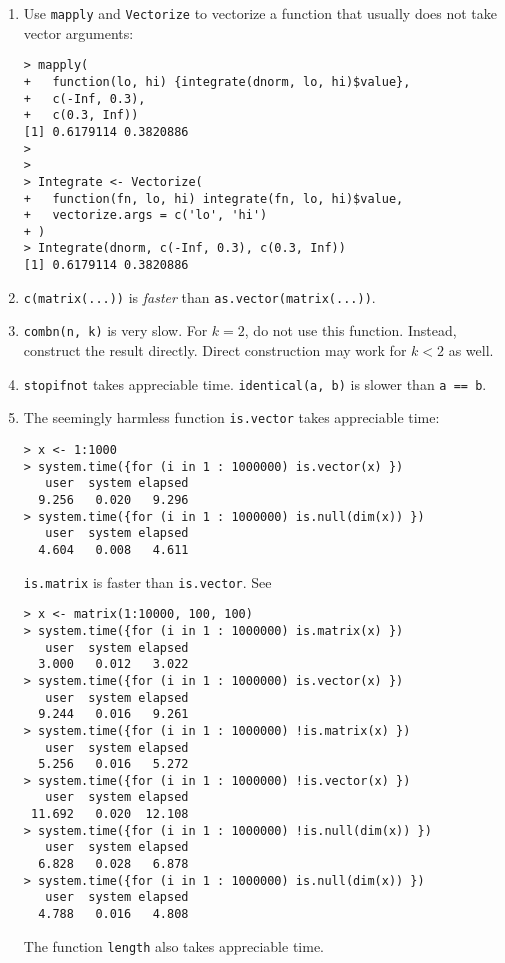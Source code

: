 \documentclass[12pt]{article}
\newcommand\Rf[1]{\texttt{#1}}
\begin{document}
\begin{enumerate}
\item
Use \Rf{mapply} and \Rf{Vectorize} to vectorize a function that usually
does not take vector arguments:
\begin{verbatim}
> mapply(
+   function(lo, hi) {integrate(dnorm, lo, hi)$value},
+   c(-Inf, 0.3),
+   c(0.3, Inf))
[1] 0.6179114 0.3820886
>
>
> Integrate <- Vectorize(
+   function(fn, lo, hi) integrate(fn, lo, hi)$value,
+   vectorize.args = c('lo', 'hi')
+ )
> Integrate(dnorm, c(-Inf, 0.3), c(0.3, Inf))
[1] 0.6179114 0.3820886
\end{verbatim}


\item
\Rf{c(matrix(...))} is \emph{faster} than
\Rf{as.vector(matrix(...))}.

\item
\Rf{combn(n, k)} is very slow.
For $k = 2$, do not use this function.
Instead, construct the result directly.
Direct construction may work for $k < 2$ as well.

\item
\Rf{stopifnot} takes appreciable time.
\Rf{identical(a, b)} is slower than \Rf{a == b}.


\item
The seemingly harmless function \Rf{is.vector} takes appreciable time:
\begin{verbatim}
> x <- 1:1000
> system.time({for (i in 1 : 1000000) is.vector(x) })
   user  system elapsed
  9.256   0.020   9.296
> system.time({for (i in 1 : 1000000) is.null(dim(x)) })
   user  system elapsed
  4.604   0.008   4.611
\end{verbatim}
\Rf{is.matrix} is faster than \Rf{is.vector}. See
\begin{verbatim}
> x <- matrix(1:10000, 100, 100)
> system.time({for (i in 1 : 1000000) is.matrix(x) })
   user  system elapsed
  3.000   0.012   3.022
> system.time({for (i in 1 : 1000000) is.vector(x) })
   user  system elapsed
  9.244   0.016   9.261
> system.time({for (i in 1 : 1000000) !is.matrix(x) })
   user  system elapsed
  5.256   0.016   5.272
> system.time({for (i in 1 : 1000000) !is.vector(x) })
   user  system elapsed
 11.692   0.020  12.108
> system.time({for (i in 1 : 1000000) !is.null(dim(x)) })
   user  system elapsed
  6.828   0.028   6.878
> system.time({for (i in 1 : 1000000) is.null(dim(x)) })
   user  system elapsed
  4.788   0.016   4.808
\end{verbatim}
The function \Rf{length} also takes appreciable time.

\end{enumerate}
\end{document}
